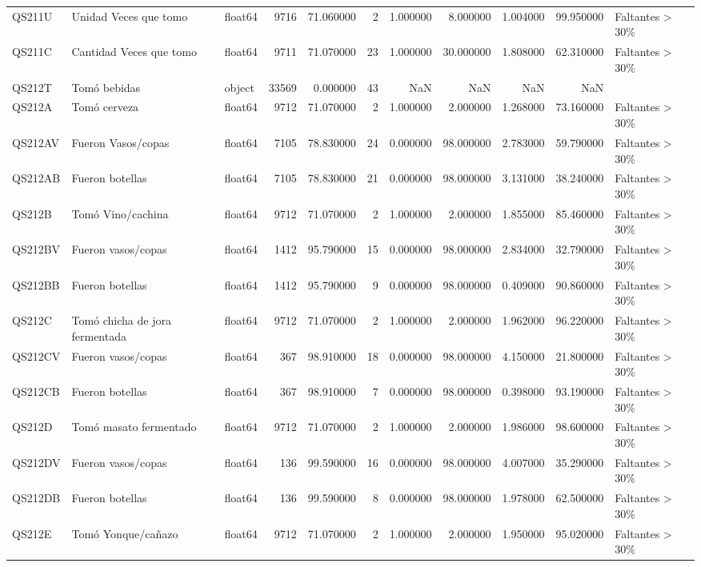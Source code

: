 \begin{longtable}{lllrrrrrrrl}
QS211U & Unidad Veces que tomo & float64 & 9716 & 71.060000 & 2 & 1.000000 & 8.000000 & 1.004000 & 99.950000 & Faltantes > 30\% \\
QS211C & Cantidad Veces que tomo & float64 & 9711 & 71.070000 & 23 & 1.000000 & 30.000000 & 1.808000 & 62.310000 & Faltantes > 30\% \\
QS212T & Tomó bebidas & object & 33569 & 0.000000 & 43 & NaN & NaN & NaN & NaN &  \\
QS212A & Tomó cerveza & float64 & 9712 & 71.070000 & 2 & 1.000000 & 2.000000 & 1.268000 & 73.160000 & Faltantes > 30\% \\
QS212AV & Fueron Vasos/copas & float64 & 7105 & 78.830000 & 24 & 0.000000 & 98.000000 & 2.783000 & 59.790000 & Faltantes > 30\% \\
QS212AB & Fueron botellas & float64 & 7105 & 78.830000 & 21 & 0.000000 & 98.000000 & 3.131000 & 38.240000 & Faltantes > 30\% \\
QS212B & Tomó Vino/cachina & float64 & 9712 & 71.070000 & 2 & 1.000000 & 2.000000 & 1.855000 & 85.460000 & Faltantes > 30\% \\
QS212BV & Fueron vasos/copas & float64 & 1412 & 95.790000 & 15 & 0.000000 & 98.000000 & 2.834000 & 32.790000 & Faltantes > 30\% \\
QS212BB & Fueron botellas & float64 & 1412 & 95.790000 & 9 & 0.000000 & 98.000000 & 0.409000 & 90.860000 & Faltantes > 30\% \\
QS212C & Tomó chicha de jora fermentada & float64 & 9712 & 71.070000 & 2 & 1.000000 & 2.000000 & 1.962000 & 96.220000 & Faltantes > 30\% \\
QS212CV & Fueron vasos/copas & float64 & 367 & 98.910000 & 18 & 0.000000 & 98.000000 & 4.150000 & 21.800000 & Faltantes > 30\% \\
QS212CB & Fueron botellas & float64 & 367 & 98.910000 & 7 & 0.000000 & 98.000000 & 0.398000 & 93.190000 & Faltantes > 30\% \\
QS212D & Tomó masato fermentado & float64 & 9712 & 71.070000 & 2 & 1.000000 & 2.000000 & 1.986000 & 98.600000 & Faltantes > 30\% \\
QS212DV & Fueron vasos/copas & float64 & 136 & 99.590000 & 16 & 0.000000 & 98.000000 & 4.007000 & 35.290000 & Faltantes > 30\% \\
QS212DB & Fueron botellas & float64 & 136 & 99.590000 & 8 & 0.000000 & 98.000000 & 1.978000 & 62.500000 & Faltantes > 30\% \\
QS212E & Tomó Yonque/cañazo & float64 & 9712 & 71.070000 & 2 & 1.000000 & 2.000000 & 1.950000 & 95.020000 & Faltantes > 30\% \\

\end{longtable}
